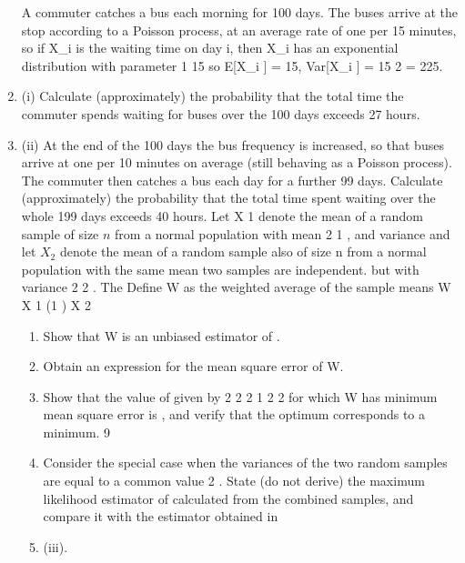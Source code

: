 \documentclass[a4paper,12pt]{article}
\begin{document}
\begin{enumerate}
A commuter catches a bus each morning for 100 days. The buses arrive at the stop according to a Poisson process, at an average rate of one per 15 minutes, so if X_i is the waiting time on day i, then X_i has an exponential distribution with parameter
1
15
so
E[X_i ] = 15, Var[X_i ] = 15 2 = 225.
\item (i) Calculate (approximately) the probability that the total time the commuter
spends waiting for buses over the 100 days exceeds 27 hours.

\item (ii) At the end of the 100 days the bus frequency is increased, so that buses arrive at one per 10 minutes on average (still behaving as a Poisson process). The commuter then catches a bus each day for a further 99 days. Calculate (approximately) the probability that the total time spent waiting over the whole 199 days exceeds 40 hours.
Let X 1 denote the mean of a random sample of size $n$ from a normal population with
mean
2
1 ,
and variance
and let $X_2$ denote the mean of a random sample also of size n from a normal population with the same mean
two samples are independent.
but with variance
2
2 .
The
Define W as the weighted average of the sample means
W
X 1 (1
) X 2

\begin{enumerate}[\item (i)]
\item Show that W is an unbiased estimator of . 
\item Obtain an expression for the mean square error of W.
\item  Show that the value of
given by
2
2
2
1
2
2
for which W has minimum mean square error is
,
and verify that the optimum corresponds to a minimum.
9
\item  Consider the special case when the variances of the two random samples are equal to a common value 2 . State (do not derive) the maximum likelihood estimator of calculated from the combined samples, and compare it with the estimator obtained in \item (iii).
\end{enumerate}



\end{enumerate}
\end{document}
